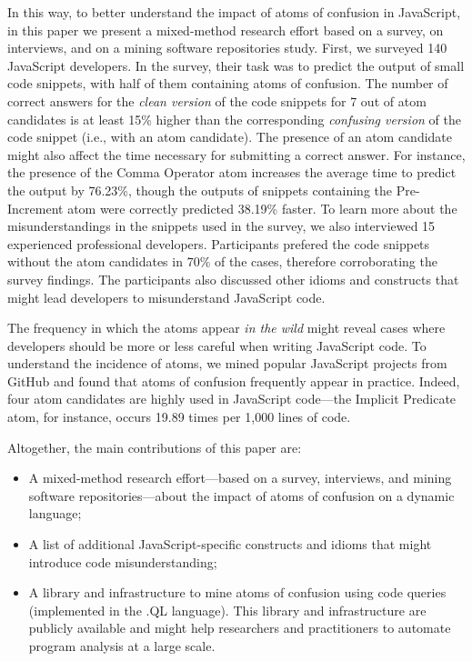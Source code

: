 In this way, to better understand the impact of atoms of confusion in JavaScript, in this paper we present a mixed-method research effort based on a survey, on interviews, and on a mining software repositories study. First, we surveyed 140 JavaScript developers. In the survey, their task was to predict the output of small code snippets, with half of them containing atoms of confusion. The number of correct answers for the \emph{clean version} of the code snippets for 7 out of \na atom candidates is at least 15\% higher than the corresponding \emph{confusing version} of the code snippet (i.e., with an atom candidate). The presence of an atom candidate might also affect the time necessary for submitting a correct answer. For instance, the presence of the Comma Operator atom increases the average time to predict the output by 76.23\%, though the outputs of snippets containing the Pre-Increment atom were correctly predicted 38.19\% faster.
To learn more about the misunderstandings in the snippets used in the survey, we also interviewed 15 experienced professional developers. Participants prefered the code snippets without the atom candidates in 70\% of the cases, therefore corroborating the survey findings. The participants also discussed other idioms and constructs that might lead developers to misunderstand JavaScript code.

The frequency in which the atoms appear \emph{in the wild} might reveal cases where developers should be more or less careful when writing JavaScript code. To understand the incidence of atoms, we mined popular JavaScript projects from GitHub and found that atoms of confusion frequently appear in practice. Indeed, four atom candidates are highly used in JavaScript code---the Implicit Predicate atom, for instance, occurs 19.89 times per 1,000 lines of code.

Altogether, the main contributions of this paper are:

\begin{itemize}
    
    \item A mixed-method research effort---based on a survey, interviews, and mining software repositories---about the impact of atoms of confusion on a
    dynamic language;
    
  \item A list of additional JavaScript-specific
    constructs and idioms that might introduce code
    misunderstanding;
    
    \item A library and infrastructure to mine atoms of confusion using 
    code queries (implemented in the .QL language). This library and 
    infrastructure are publicly available and might help researchers and 
    practitioners to automate program analysis at a large scale.

\end{itemize}

